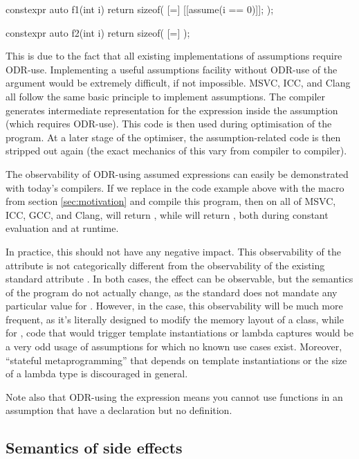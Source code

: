 \begin{codeblock}
constexpr auto f1(int i) { 
  return sizeof( [=] { [[assume(i == 0)]]; } );
}

constexpr auto f2(int i) {
  return sizeof( [=] {} );
}
\end{codeblock}

This is due to the fact that all existing implementations of assumptions require ODR-use. Implementing a useful assumptions facility without ODR-use of the argument would be extremely difficult, if not impossible. MSVC, ICC, and Clang all follow the same basic principle to implement assumptions. The compiler generates intermediate representation for the expression inside the assumption (which requires ODR-use). This code is then used during optimisation of the program. At a later stage of the optimiser, the assumption-related code is then stripped out again (the exact mechanics of this vary from compiler to compiler).

The observability of ODR-using assumed expressions can easily be demonstrated with today's compilers. If we replace \tcode{[[assume]]} in the code example above with the  macro from section \ref{sec:motivation} and compile this program, then on all of MSVC, ICC, GCC, and Clang,  will return , while  will return , both during constant evaluation and at runtime.

In practice, this should not have any negative impact. This observability of the \tcode{[[assume]]} attribute is not categorically different from the observability of the existing standard attribute . In both cases, the effect can be observable, but the semantics of the program do not actually change, as the standard does not mandate any particular value for . However, in the  case, this observability will be much more frequent, as it's literally designed to modify the memory layout of a class, while for \tcode{[[assume]]}, code that would trigger template instantiations or lambda captures would be a very odd usage of assumptions for which no known use cases exist. Moreover, ``stateful metaprogramming'' that depends on template instantiations or the size of a lambda type is discouraged in general.

Note also that ODR-using the expression means you cannot use functions in an assumption that have a declaration but no definition.

\subsection{Semantics of side effects}
\label{subsec:side_effects}

